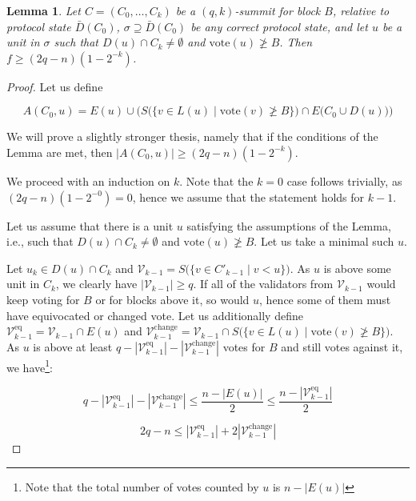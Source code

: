 \documentclass[12pt, fleqn]{article}
\newtheorem{lemma}{Lemma}
\newcommand{\vote}{\mathrm{vote}}
\begin{document}
\begin{lemma}\label{LemmaSummit}
Let $C = (C_0,\dots,C_k)$ be a $(q,k)$-summit for block $B$, relative to protocol state $\bar{D}(C_0)$, $\sigma\supseteq\bar{D}(C_0)$ be any correct protocol state, and let $u$ be a unit in $\sigma$ such that $D(u)\cap C_k\neq\emptyset$ and $\vote(u)\not\geq B$.
Then $f\geq (2q-n)(1-2^{-k})$.
\end{lemma}



\begin{proof}

Let us define 

$$A(C_0,u) = E(u)\cup \Big(S\big(\{v\in L(u) \mid \vote(v) \not\geq B\}\big) \cap E\big(C_0 \cup D(u)\big)\Big)$$

We will prove a slightly stronger thesis, namely that if the conditions of the Lemma are met, then $|A(C_0,u)| \geq (2q-n)(1-2^{-k})$.

We proceed with an induction on $k$.
Note that the $k = 0$ case follows trivially, as $(2q-n)(1-2^{-0}) = 0$, hence we assume that the statement holds for $k-1$.

Let us assume that there is a unit $u$ satisfying the assumptions of the Lemma, i.e., such that $D(u)\cap C_k\neq\emptyset$ and $\vote(u)\not\geq B$.
Let us take a minimal such $u$.

Let $u_k\in D(u)\cap C_k$ and $\mathcal{V}_{k-1} = S\big(\{v\in C'_{k-1}\mid v< u \}\big)$.
As $u$ is above some unit in $C_k$, we clearly have $| \mathcal{V}_{k-1}|\geq q$.
If all of the validators from $\mathcal{V}_{k-1}$ would keep voting for $B$ or for blocks above it, so would $u$, hence some of them must have equivocated or changed vote.
Let us additionally define $\mathcal{V}^{\mathrm{eq}}_{k-1} =\mathcal{V}_{k-1}\cap  E(u)$ and $\mathcal{V}^{\mathrm{change}}_{k-1} = \mathcal{V}_{k-1}\cap S\Big(\{v\in L(u)\mid \vote(v) \not\geq B\}\Big)$.
As $u$ is above at least $q-|\mathcal{V}^{\mathrm{eq}}_{k-1}|-|\mathcal{V}^{\mathrm{change}}_{k-1}|$ votes for $B$ and still votes against it, we have\footnote{Note that the total number of votes counted by $u$ is $n-|E(u)|$}:


\begin{equation*}
q-|\mathcal{V}^{\mathrm{eq}}_{k-1}|-|\mathcal{V}^{\mathrm{change}}_{k-1}| \leq \frac{n-|E(u)|}{2} \leq \frac{n-|\mathcal{V}^{\mathrm{eq}}_{k-1}|}{2}
\end{equation*}

\begin{equation}\label{EquationSummit1}
2q-n \leq |\mathcal{V}^{\mathrm{eq}}_{k-1}| +2|\mathcal{V}^{\mathrm{change}}_{k-1}|
\end{equation}


\end{proof}
\end{document}
